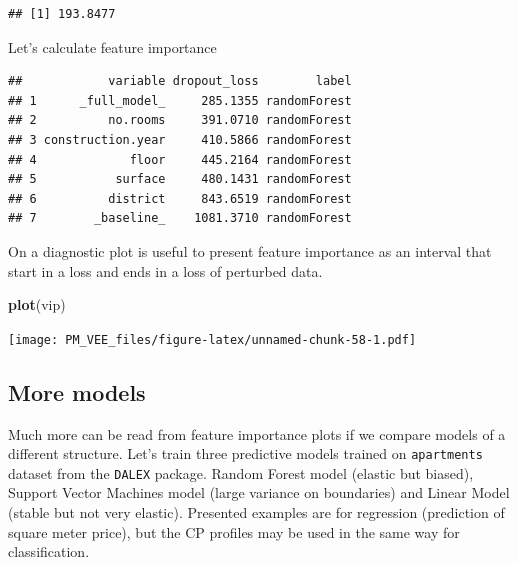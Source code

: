 \documentclass[]{krantz}
\newenvironment{Shaded}{\begin{snugshade}}{\end{snugshade}}
\newcommand{\DataTypeTok}[1]{\textcolor[rgb]{0.13,0.29,0.53}{#1}}
\newcommand{\DecValTok}[1]{\textcolor[rgb]{0.00,0.00,0.81}{#1}}
\newcommand{\KeywordTok}[1]{\textcolor[rgb]{0.13,0.29,0.53}{\textbf{#1}}}
\newcommand{\NormalTok}[1]{#1}
\newcommand{\OperatorTok}[1]{\textcolor[rgb]{0.81,0.36,0.00}{\textbf{#1}}}
\newcommand{\StringTok}[1]{\textcolor[rgb]{0.31,0.60,0.02}{#1}}
\theoremstyle{definition}
\theoremstyle{definition}
\theoremstyle{definition}
\theoremstyle{remark}
\begin{document}
\begin{verbatim}
## [1] 193.8477
\end{verbatim}

Let's calculate feature importance

\begin{Shaded}
\end{Shaded}

\begin{verbatim}
##            variable dropout_loss        label
## 1      _full_model_     285.1355 randomForest
## 2          no.rooms     391.0710 randomForest
## 3 construction.year     410.5866 randomForest
## 4             floor     445.2164 randomForest
## 5           surface     480.1431 randomForest
## 6          district     843.6519 randomForest
## 7        _baseline_    1081.3710 randomForest
\end{verbatim}

On a diagnostic plot is useful to present feature importance as an
interval that start in a loss and ends in a loss of perturbed data.

\begin{Shaded}
\begin{Highlighting}[]
\KeywordTok{plot}\NormalTok{(vip)}
\end{Highlighting}
\end{Shaded}

\texttt{[image: PM\_VEE\_files/figure-latex/unnamed-chunk-58-1.pdf]}

\hypertarget{more-models}{%
\subsection{More models}\label{more-models}}

Much more can be read from feature importance plots if we compare models
of a different structure. Let's train three predictive models trained on
\texttt{apartments} dataset from the \texttt{DALEX} package. Random
Forest model \citep{R-randomForest} (elastic but biased), Support Vector
Machines model \citep{R-e1071} (large variance on boundaries) and Linear
Model (stable but not very elastic). Presented examples are for
regression (prediction of square meter price), but the CP profiles may
be used in the same way for classification.
\end{document}
